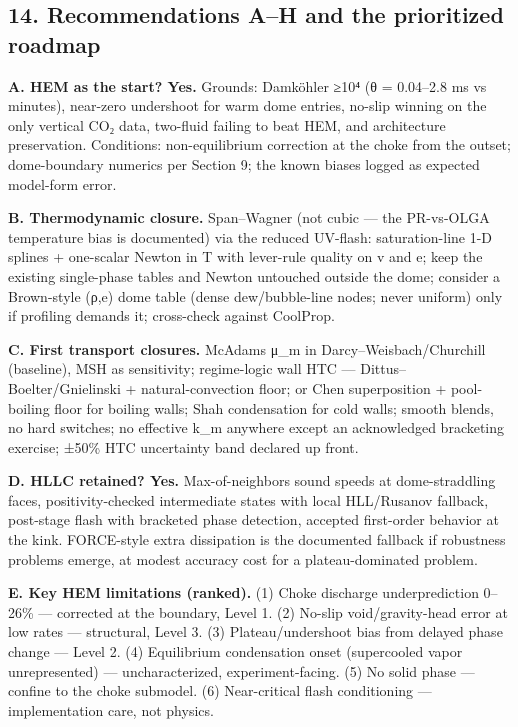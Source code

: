 \hypertarget{recommendations-ah-and-the-prioritized-roadmap}{%
\subsection{14. Recommendations A--H and the prioritized
roadmap}\label{recommendations-ah-and-the-prioritized-roadmap}}

\textbf{A. HEM as the start? Yes.} Grounds: Damköhler ≥10⁴ (θ =
0.04--2.8 ms vs minutes), near-zero undershoot for warm dome entries,
no-slip winning on the only vertical CO₂ data, two-fluid failing to beat
HEM, and architecture preservation. Conditions: non-equilibrium
correction at the choke from the outset; dome-boundary numerics per
Section 9; the known biases logged as expected model-form error.

\textbf{B. Thermodynamic closure.} Span--Wagner (not cubic --- the
PR-vs-OLGA temperature bias is documented) via the reduced UV-flash:
saturation-line 1-D splines + one-scalar Newton in T with lever-rule
quality on v and e; keep the existing single-phase tables and Newton
untouched outside the dome; consider a Brown-style (ρ,e) dome table
(dense dew/bubble-line nodes; never uniform) only if profiling demands
it; cross-check against CoolProp.

\textbf{C. First transport closures.} McAdams μ\_m in
Darcy--Weisbach/Churchill (baseline), MSH as sensitivity; regime-logic
wall HTC --- Dittus--Boelter/Gnielinski + natural-convection floor; \citet{shah2017} or Chen superposition + pool-boiling floor for boiling walls; Shah
condensation for cold walls; smooth blends, no hard switches; no
effective k\_m anywhere except an acknowledged bracketing exercise;
±50\% HTC uncertainty band declared up front.

\textbf{D. HLLC retained? Yes.} Max-of-neighbors sound speeds at
dome-straddling faces, positivity-checked intermediate states with local
HLL/Rusanov fallback, post-stage flash with bracketed phase detection,
accepted first-order behavior at the kink. FORCE-style extra dissipation
is the documented fallback if robustness problems emerge, at modest
accuracy cost for a plateau-dominated problem.

\textbf{E. Key HEM limitations (ranked).} (1) Choke discharge
underprediction 0--26\% --- corrected at the boundary, Level 1. (2)
No-slip void/gravity-head error at low rates --- structural, Level 3.
(3) Plateau/undershoot bias from delayed phase change --- Level 2. (4)
Equilibrium condensation onset (supercooled vapor unrepresented) ---
uncharacterized, experiment-facing. (5) No solid phase --- confine to
the choke submodel. (6) Near-critical flash conditioning ---
implementation care, not physics.

